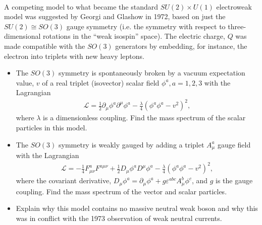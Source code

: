 \clearpage
{} \\
A competing model to what became the standard $SU(2)\times U(1)$ electroweak model was suggested by Georgi and Glashow in 1972, based on just the $SU(2)\cong SO(3)$ gauge symmetry (i.e. the symmetry with respect to three-dimensional rotations in the “weak isospin” space). The electric charge, $Q$ was made compatible with the $SO(3)$ generators by embedding, for instance, the electron into triplets with new heavy leptons.

\begin{itemize}
    \item [(a)] The $SO(3)$ symmetry is spontaneously broken by a vacuum expectation value, $v$ of a real triplet (isovector) scalar field $\phi^a, a=1,2,3$ with the Lagrangian
    \begin{align}
        \mathcal{L} = \frac{1}{2} \partial_\mu \phi^a \partial^\mu \phi^a-\frac{\lambda}{4} (\phi^a \phi^a -v^2)^2,
    \end{align}
    where $\lambda$ is a dimensionless coupling. Find the mass spectrum of the scalar particles in this model.
    \item [(b)] The $SO(3)$ symmetry is weakly gauged by adding a triplet $A_\mu^a$ gauge field with the Lagrangian 
    \begin{align}
        \mathcal{L} = -\frac{1}{4} F_{\mu\nu}^a F^{a\mu\nu} +\frac{1}{2} D_\mu \phi^a D^\mu \phi^a-\frac{\lambda}{4} (\phi^a \phi^a -v^2)^2,    
    \end{align}
    where the covariant derivative, $D_\mu \phi^a =\partial_\mu \phi^a +g \varepsilon^{abc} A_\mu^b \phi^c$, and $g$ is the gauge coupling. Find the mass spectrum of the vector and scalar particles.
    \item [(c)] Explain why this model contains no massive neutral weak boson and why this was in conflict with the 1973 observation of weak neutral currents.
\end{itemize}

